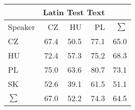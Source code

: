 \begin{tabular}{l|rrr|r}
\hline
 & \multicolumn{3}{c}{Latin Test Text} & \\
\hline
 Speaker   &   CZ &   HU &   PL &   $\sum$ \\
\hline
 CZ        & 67.4 & 50.5 & 77.1 &     65.0 \\
 HU        & 72.4 & 57.3 & 75.2 &     68.3 \\
 PL        & 75.0 & 63.6 & 80.7 &     73.1 \\
 SK        & 52.6 & 39.1 & 61.5 &     51.1 \\
\hline
 $\sum$   & 67.0 & 52.2 & 74.3 &     64.5 \\
\hline
\end{tabular}